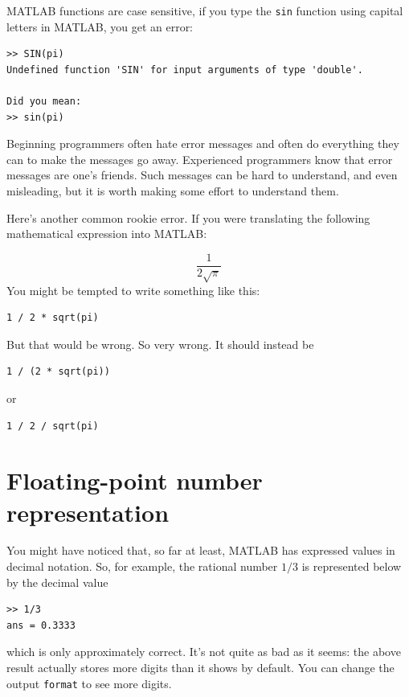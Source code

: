 \documentclass[
]{book}
\begin{document}
MATLAB functions are case sensitive, if you type the {\tt sin} function using capital letters
in MATLAB, you get an error:

\begin{verbatim}
>> SIN(pi)
Undefined function 'SIN' for input arguments of type 'double'.

Did you mean:
>> sin(pi)
\end{verbatim}

Beginning programmers often hate error messages and often do everything they
can to make the messages go away.  Experienced programmers know that error
messages are one's friends.  Such messages can be hard to understand, and even
misleading, but it is worth making some effort to understand them.

Here's another common rookie error.  If you were translating
the following mathematical
expression into MATLAB:

\begin{equation}
 \frac{1}{2 \sqrt \pi}
\end{equation}
You might be tempted to write something like this:

\begin{verbatim}
1 / 2 * sqrt(pi)
\end{verbatim}

But that would be wrong.  So very wrong.  It should instead be

\begin{verbatim}
1 / (2 * sqrt(pi))
\end{verbatim}

or

\begin{verbatim}
1 / 2 / sqrt(pi)
\end{verbatim}


\section{Floating-point number representation}

You might have noticed that, so far at least, MATLAB has expressed values in decimal
notation.  So, for example, the rational number $1/3$ is represented below
by the decimal value

\begin{verbatim}
>> 1/3
ans = 0.3333
\end{verbatim}

which is only approximately correct.  It's not quite as bad as
it seems: the above result actually stores more digits than it shows by default.
You can change the output {\tt format} to see more digits.
\end{document}
